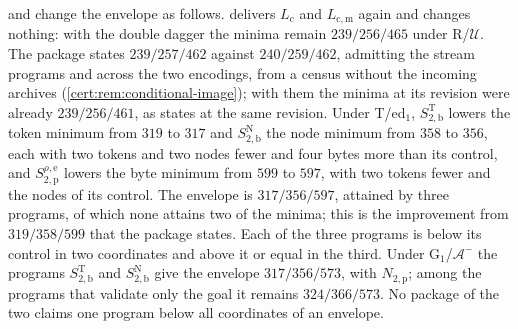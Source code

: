  and  change the envelope
as follows.  delivers $L_{\mathrm c}$ and
$L_{\mathrm{c,m}}$ again and changes nothing: with the double dagger the minima
remain $239/256/465$ under R/$\mathcal U$. The package states $239/257/462$
against $240/259/462$, admitting the stream programs and across the two encodings,
from a census without the incoming archives (\cref{cert:rem:conditional-image});
with them the minima at its revision were already $239/256/461$, as
 states at the same revision. Under T/ed$_1$,
$S^{\mathrm T}_{2,\mathrm b}$ lowers the token minimum from $319$ to $317$ and
$S^{\mathrm N}_{2,\mathrm b}$ the node minimum from $358$ to $356$, each with two
tokens and two nodes fewer and four bytes more than its control, and
$S^{\rho,\mathrm e}_{2,\mathrm p}$ lowers the byte minimum from $599$ to $597$, with
two tokens fewer and the nodes of its control. The envelope is $317/356/597$,
attained by three programs, of which none attains two of the minima; this is the
improvement from $319/358/599$ that the package states. Each of the three programs
is below its control in two coordinates and above it or equal in the third. Under
G$_1$/$\mathcal A^{-}$ the programs $S^{\mathrm T}_{2,\mathrm b}$ and
$S^{\mathrm N}_{2,\mathrm b}$ give the envelope $317/356/573$, with $N_{2,\mathrm p}$;
among the programs that validate only the goal it remains $324/366/573$. No package
of the two claims one program below all coordinates of an envelope.

